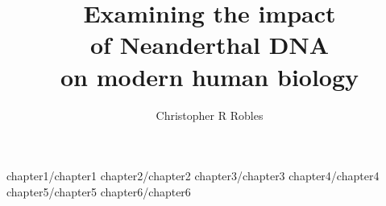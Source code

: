 \documentclass [PhD] {uclathes}
\title          {Examining the impact \\
                of Neanderthal DNA \\
                on modern human biology}
\author         {Christopher R Robles}
\begin{document}
\makeintropages

%
%
 {chapter1/chapter1}                         %
 {chapter2/chapter2}                         %
 {chapter3/chapter3}                         %
 {chapter4/chapter4}
 {chapter5/chapter5}
 {chapter6/chapter6}
 \typeout{}


\end{document}
